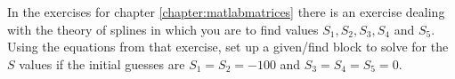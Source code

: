 {In the exercises for chapter \ref{chapter:matlabmatrices} there is an exercise dealing with the theory of splines in which you are to find values $S_1,S_2,S_3,S_4$ and $S_5$. Using the equations from that exercise, set up a given/find block to solve for the $S$ values if the initial guesses are $S_1=S_2=-100$ and $S_3=S_4=S_5=0$.
}
{}